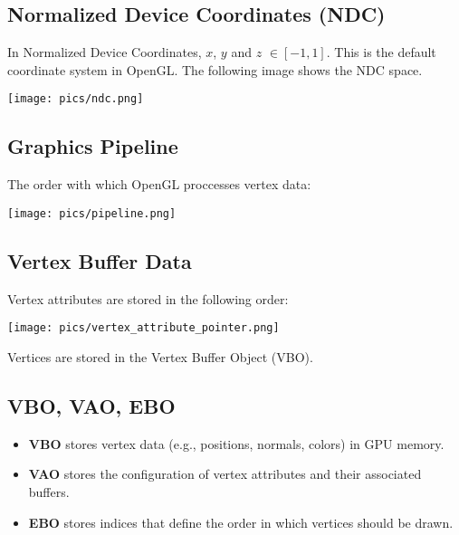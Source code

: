 \subsection{Normalized Device Coordinates (NDC)}

In Normalized Device Coordinates, $x$, $y$ and $z$ $\in [-1,1]$. This is the default coordinate system in OpenGL. The following image shows the NDC space.

\begin{center}
    \texttt{[image: pics/ndc.png]}
\end{center}

\subsection{Graphics Pipeline}

The order with which OpenGL proccesses vertex data:

\begin{center}
    \texttt{[image: pics/pipeline.png]}
\end{center}

\subsection{Vertex Buffer Data}

Vertex attributes are stored in the following order:

\begin{center}
    \texttt{[image: pics/vertex\_attribute\_pointer.png]}
\end{center}

Vertices are stored in the Vertex Buffer Object (VBO).

\subsection{VBO, VAO, EBO}

\begin{itemize}
    \item \textbf{VBO} stores vertex data (e.g., positions, normals, colors) in GPU memory. 
    \item \textbf{VAO} stores the configuration of vertex attributes and their associated buffers. 
    \item \textbf{EBO} stores indices that define the order in which vertices should be drawn. 
\end{itemize}